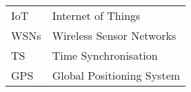 \begin{frontmattersection}[Abbreviations]
\begin{longtable}{ll}
IoT & Internet of Things \\
WSNs & Wireless Sensor Networks \\
TS & Time Synchronisation \\
GPS & Global Positioning System \\
\end{longtable}
\end{frontmattersection} 